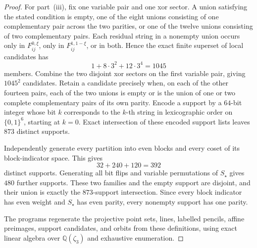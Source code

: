 \documentclass[11pt,letterpaper,onecolumn]{article}
\theoremstyle{plain}
\theoremstyle{definition}
\theoremstyle{remark}
\begin{document}
\begin{proof}
		For part~\textnormal{(iii)}, fix one variable pair and one xor sector.  A union satisfying the stated condition is empty, one of the eight unions consisting of one complementary pair across
		the two parities, or one of the twelve unions consisting of two complementary pairs.  Each residual string
		in a nonempty union occurs only in \(F_{ij}^{0,\xi}\), only in
		\(F_{ij}^{1,1-\xi}\), or in both.  Hence the exact finite superset of local candidates has
		\[
		1+8\cdot3^2+12\cdot3^4=1045
		\]
		members.  Combine the two disjoint xor sectors on the first variable pair,
		giving \(1045^2\) candidates.  Retain a candidate precisely when, on
		each of the other fourteen pairs, each of the two unions is empty or is
		the union of one or two complete complementary pairs of its own parity.  Encode a support by a
		\(64\)-bit integer whose bit \(k\) corresponds to the \(k\)-th string in
		lexicographic order on \(\{0,1\}^6\), starting at \(k=0\).  Exact
		intersection of these encoded support lists leaves \(873\) distinct supports.
		
		Independently generate every partition into even blocks and every
		coset of its block-indicator space.  This gives
		\[
		32+240+120=392
		\]
		distinct supports.  Generating all bit flips and variable permutations of
		\(S_\star\) gives \(480\) further supports.  These two families and the
		empty support are disjoint, and their union is exactly the \(873\)-support
		intersection.  Since every block indicator has even weight and
		\(S_\star\) has even parity, every nonempty support has one parity.
		
        The programs regenerate the projective point sets, lines, labelled
        pencils, affine preimages, support candidates, and orbits from these
        definitions, using exact linear algebra over \(\mathbb Q(\zeta_3)\)
        and exhaustive enumeration.
	\end{proof}
	
\end{document}
